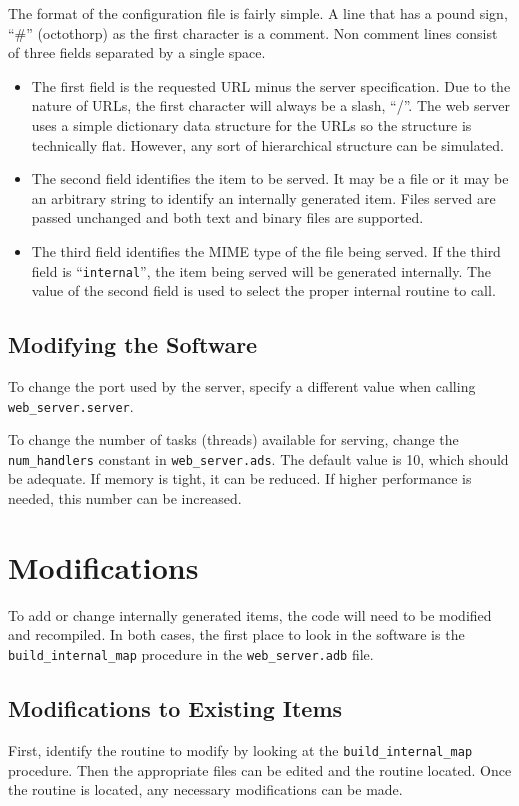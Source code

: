 \documentclass[10pt, openany, draft]{article}
\begin{document}
The format of the configuration file is fairly simple.  A line that has a pound sign, ``\#'' (octothorp) as the first character is a comment.  Non comment lines consist of three fields separated by a single space.
\begin{itemize}
  \item The first field is the requested URL minus the server specification.  Due to the nature of URLs, the first character will always be a slash, ``/''.  The web server uses a simple dictionary data structure for the URLs so the structure is technically flat.  However, any sort of hierarchical structure can be simulated.
  \item The second field identifies the item to be served.  It may be a file or it may be an arbitrary string to identify an internally generated item.  Files served are passed unchanged and both text and binary files are supported.
  \item The third field identifies the MIME type of the file being served.  If the third field is ``\texttt{internal}'', the item being served will be generated internally.  The value of the second field is used to select the proper internal routine to call.
\end{itemize}

\subsection{Modifying the Software}
To change the port used by the server, specify a different value when calling \texttt{web\_server.server}.

To change the number of tasks (threads) available for serving, change the \texttt{num\_handlers} constant in \texttt{web\_server.ads}.  The default value is 10, which should be adequate.  If memory is tight, it can be reduced. If higher performance is needed, this number can be increased.

\section{Modifications}
To add or change internally generated items, the code will need to be modified and recompiled.  In both cases, the first place to look in the software is the \texttt{build\_internal\_map} procedure in the \texttt{web\_server.adb} file.

\subsection{Modifications to Existing Items}
First, identify the routine to modify by looking at the \texttt{build\_internal\_map} procedure.  Then the appropriate files can be edited and the routine located.  Once the routine is located, any necessary modifications can be made.
\end{document}
